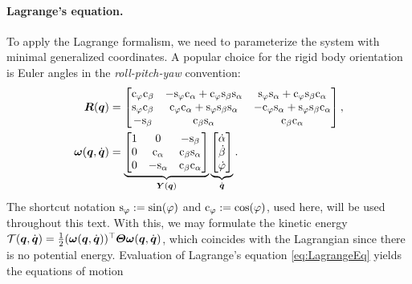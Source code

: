 \paragraph{Lagrange's equation.}
To apply the Lagrange formalism, we need to parameterize the system with minimal generalized coordinates.
A popular choice for the rigid body orientation is Euler angles in the \textit{roll-pitch-yaw} convention:
\begin{subequations}\label{eq:EulerAngleParam}
\begin{align}
 \R(\genCoord) &=
 \begin{bmatrix}
  \cyaw \cpit & -\syaw \crol+\cyaw \spit \srol & \syaw \srol+\cyaw \spit \crol \\
  \syaw \cpit & \cyaw \crol+\syaw \spit \srol & -\cyaw \srol+\syaw \spit \crol \\
  -\spit & \cpit \srol & \cpit \crol  
 \end{bmatrix},
 \label{eq:EulerAngleParamR}
\\
 \w(\genCoord, \genCoordd) &=
 \underbrace{\begin{bmatrix}
  1 & 0 & -\spit \\
  0 & \crol & \cpit \srol \\
  0 & -\srol & \cpit \crol
 \end{bmatrix}}_{\kinBasisMat(\genCoord)}
 \underbrace{\begin{bmatrix} \rold \\ \pitd \\ \yawd \end{bmatrix}}_{\genCoordd}.
 \label{eq:EulerAngleParamW}
\end{align}
\end{subequations}
The shortcut notation $\syaw := \sin(\yaw)$ and $\cyaw := \cos(\yaw)$, used here, will be used throughout this text.
With this, we may formulate the kinetic energy $\kineticEnergy(\genCoord, \genCoordd) = \tfrac{1}{2} (\w(\genCoord, \genCoordd))^\top \J \w(\genCoord, \genCoordd)$, which coincides with the Lagrangian since there is no potential energy.
Evaluation of Lagrange's equation \eqref{eq:LagrangeEq} yields the equations of motion 
